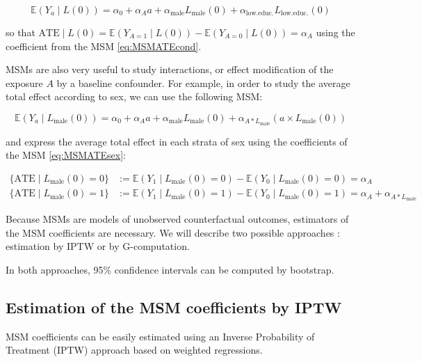 \documentclass[
]{book}
\begin{document}
\begin{equation} 
  \mathbb{E}(Y_a \mid L(0)) = \alpha_0 + \alpha_A a + \alpha_\text{male} L_\text{male}(0) + \alpha_\text{low.educ.} L_\text{low.educ.}(0)
  \label{eq:MSMATEcond}
\end{equation}

so that \(\text{ATE} \mid L(0) = \mathbb{E}(Y_{A=1} \mid L(0)) - \mathbb{E}(Y_{A=0} \mid L(0)) = \alpha_A\) using the coefficient from the MSM \eqref{eq:MSMATEcond}.

MSMs are also very useful to study interactions, or effect modification of the exposure \(A\) by a baseline confounder. For example, in order to study the average total effect according to sex, we can use the following MSM:

\begin{equation} 
  \mathbb{E}(Y_a \mid L_\text{male}(0)) = \alpha_0 + \alpha_A a + \alpha_\text{male} L_\text{male}(0) + \alpha_{A \ast L_\text{male}} \left(a \times L_\text{male}(0)\right)
  \label{eq:MSMATEsex}
\end{equation}

and express the average total effect in each strata of sex using the coefficients of the MSM \eqref{eq:MSMATEsex}:

\begin{align*}
 \{\text{ATE} \mid L_\text{male}(0) = 0\} &:= \mathbb{E}(Y_1 \mid L_\text{male}(0) = 0) - \mathbb{E}(Y_0 \mid L_\text{male}(0) = 0) = \alpha_A \\
 \{\text{ATE} \mid L_\text{male}(0) = 1\} &:= \mathbb{E}(Y_1 \mid L_\text{male}(0) = 1) - \mathbb{E}(Y_0 \mid L_\text{male}(0) = 1) = \alpha_A + \alpha_{A \ast L_\text{male}}
\end{align*}

Because MSMs are models of unobserved counterfactual outcomes, estimators of the MSM coefficients are necessary. We will describe two possible approaches : estimation by IPTW or by G-computation.

In both approaches, 95\% confidence intervals can be computed by bootstrap.

\subsection{Estimation of the MSM coefficients by IPTW}\label{estimation-of-the-msm-coefficients-by-iptw}

MSM coefficients can be easily estimated using an Inverse Probability of Treatment (IPTW) approach based on weighted regressions.
\end{document}
